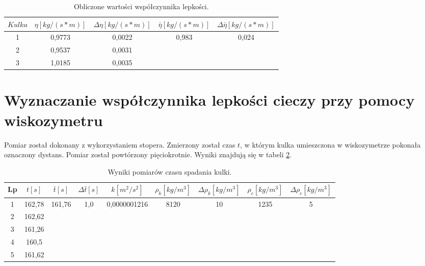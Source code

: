 \documentclass[wide,a4paper,titlepage,12pt]{mwart}
\begin{document}
    \begin{table}
      \begin{center}
        \begin{tabular}{|c|c|c|c|c|}
          \hline
            $Kulka$ &
            $\eta[kg/(s*m)]$ &
            $\Delta \eta[kg/(s*m)]$ &
            $\bar{\eta}[kg/(s*m)]$ &
            $\Delta \bar{\eta}[kg/(s*m)]$ \\
          \hline
          	1 & 0,9773 & 0,0022 & \multirow{3}{*}{0,983} & \multirow{3}{*}{0,024} \\
          	2 & 0,9537 & 0,0031 & & \\
            3 & 1,0185 & 0,0035 & & \\
          \hline
        \end{tabular}
      \end{center}
      \caption{\label{lepkosc1} Obliczone wartości współczynnika lepkości.}
    \end{table}
    
  \clearpage 
  \section{Wyznaczanie współczynnika lepkości cieczy przy pomocy wiskozymetru}
    Pomiar został dokonany z wykorzystaniem stopera. Zmierzony został czas $t$, w którym kulka umieszczona w wiskozymetrze pokonała oznaczony dystans. Pomiar został powtórzony pięciokrotnie. Wyniki znajdują się w tabeli \ref{wisko}.
   
   
    \begin{table}[h]
      \begin{center}
        \begin{tabular}{|c|c|c|c|c|c|c|c|c|}
          \hline
            Lp & 
            $t [s]$ & 
            $\bar{t} [s]$ &
            $\Delta \bar{t}[s]$ &
            $k [m^2 / s^2]$ &
            $\rho_k [kg/m^3]$ & 
            $\Delta \rho_k [kg/m^3]$ &
            $\rho_c [kg/m^3]$ & 
            $\Delta \rho_c [kg/m^3]$  \\
          \hline
            1 &	162,78 & 
              \multirow{5}{*}{161,76} &
              \multirow{5}{*}{1,0} &
              \multirow{5}{*}{0,0000001216} &
              \multirow{5}{*}{8120} &
              \multirow{5}{*}{10} &
              \multirow{5}{*}{1235} &
              \multirow{5}{*}{5} \\
            2	& 162,62 & & & & & & & \\
            3	& 161,26 & & & & & & & \\
            4	& 160,5  & & & & & & & \\
            5 &	161,62 & & & & & & & \\
          \hline
        \end{tabular}
      
      \end{center}
          \caption{\label{wisko} Wyniki pomiarów czasu spadania kulki.}
    \end{table}
    
\end{document}

